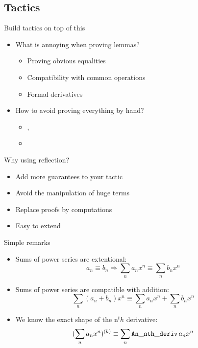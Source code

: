 \documentclass{beamer}
\begin{document}
\subsection{Tactics}

\begin{frame}{Build tactics on top of this}
\begin{itemize}
  \item What is annoying when proving lemmas?
  \begin{itemize}
    \item Proving obvious equalities
    \item Compatibility with common operations
    \item Formal derivatives
  \end{itemize}
  \item How to avoid proving everything by hand?
  \begin{itemize}
    \item \ring{}, \field{}
    \item \solve{}
  \end{itemize}
\end{itemize}
\end{frame}

\begin{frame}{Why using reflection?}
\begin{itemize}
 \item Add more guarantees to your tactic
 \item Avoid the manipulation of huge terms
 \item Replace proofs by computations
 \item Easy to extend
\end{itemize}
\end{frame}

\begin{frame}{Simple remarks}
\begin{itemize}
  \item Sums of power series are extentional:
    $$a_n \equiv b_n \Rightarrow
   \sum_n a_n x^ n \equiv \sum_n b_n x ^ n$$
  \item Sums of power series are compatible with addition:
    $$\sum_n (a_n + b_n) x^ n \equiv \sum_n a_n x ^ n + \sum_n b_n x ^ n$$
  \item We know the exact shape of the n$^th$ derivative:
    $$(\sum_n a_n x^ n)^{(k)} \equiv \sum_n \operatorname{\mathtt{An\_nth\_deriv}} a_n x ^ n$$
\end{itemize}
\end{frame}
\end{document}
